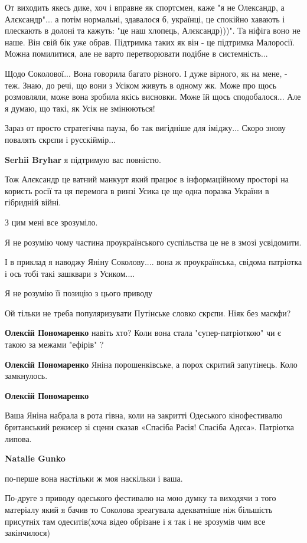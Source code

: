 \begin{itemize}
\begin{itemize}
От виходить якесь дике, хоч і вправне як спортсмен, каже "я не Олександр, а
Алєксандр"... а потім нормальні, здавалося б, українці, це спокійно хавають і
плескають в долоні та кажуть: "це наш хлопець, Алєксандр)))". Та ніфіга воно не
наше. Він свій бік уже обрав. Підтримка таких як він - це підтримка Малоросії.
Можна помилитися, але не варто перетворювати подібне в системність...

Щодо Соколової... Вона говорила багато різного. І дуже вірного, як на мене, -
теж. Знаю, до речі, що вони з Усіком живуть в одному жк. Може про щось
розмовляли, може вона зробила якісь висновки. Може їй щось сподобалося... Але я
думаю, що такі, як Усік не змінюються! 

Зараз от просто стратегічна пауза, бо так вигідніше для іміджу... Скоро знову
повалять скрєпи і русскіймір...


\textbf{Serhii Bryhar} я підтримую вас повністю.

Тож Алєксандр це ватний манкурт який працює в інформаційному просторі на
користь росії та ця перемога в ринзі Усика це ще одна поразка України в
гібридній війні.

З цим мені все зрозуміло.

Я не розумію чому частина проукраїнського суспільства це не в змозі усвідомити.

І в приклад я наводжу Яніну Соколову.... вона ж проукраїнська, свідома
патріотка і ось тобі такі зашквари з Усиком....

Я не розумію її позицію з цього приводу

Ой тільки не треба популяризувати Путінське словко скрєпи. Ніяк без маскфи?

\textbf{Олексій Пономаренко} навіть хто?
Коли вона стала "супер-патріоткою" чи є такою за межами "ефірів" ?

\textbf{Олексій Пономаренко} Яніна порошенківське, а порох скритий запутінець. Коло замкнулось.

\textbf{Олексій Пономаренко} 

Ваша Яніна набрала в рота гівна, коли на закритті Одеського кінофестивалю
британський режисер зі сцени сказав «Спасіба Расія! Спасіба Адєса». Патріотка
липова.

\textbf{Natalie Gunko} 

по-перше вона настільки ж моя наскільки і ваша.

По-друге з приводу одеського фестивалю на мою думку та виходячи з того
матеріалу який я бачив то Соколова зреагувала адекватніше ніж більшість
присутніх там одеситів(хоча відео обрізане і я так і не зрозумів чим все
закінчилося)


\end{itemize}
\end{itemize}
